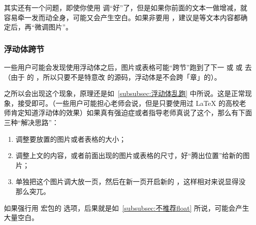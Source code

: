 其实还有一个问题，即使你使用  调“好”了，但是如果你前面的文本一做增减，就容易牵一发而动全身，可能又会产生空白。如果非要用 ，建议是等文本内容都确定后，再“微调图片”。


\subsubsection{浮动体跨节}

一些用户可能会发现使用浮动体之后，图片或表格可能“跨节”跑到了下一  或  或  去（由于  的 ，所以只要不是特意改  的源码，浮动体是不会跨「章」的）。

之所以会出现这个现象，原理还是如~\ref{subsubsec:浮动体乱跑} 中所说。这是正常现象，接受即可。（一些用户可能担心老师会说，但是只要使用过 \LaTeX{} 的高校老师肯定知道浮动体的效果）如果真有强迫症或者指导老师真说了这个，那么有下面三种“解决思路”：

\begin{enumerate}
  \item 调整要放置的图片或者表格的大小；
  \item 调整上文的内容，或者前面出现的图片或表格的尺寸，好“腾出位置”给新的图片；
  \item 单独把这个图片调大放一页，然后在新一页开启新的 ，这样相对来说显得没那么突兀。
\end{enumerate}

如果强行用  宏包的  选项，后果就是如~\ref{subsubsec:不推荐float} 所说，可能会产生大量空白。